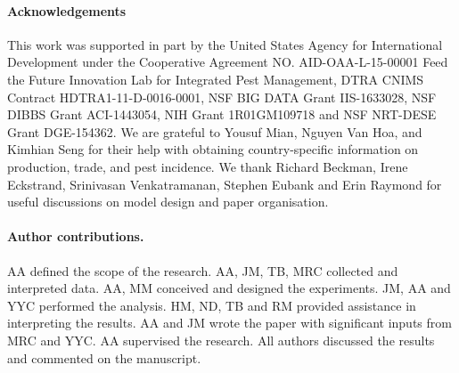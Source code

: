 \documentclass[11pt]{article}
\theoremstyle{definition}
\begin{document}
\paragraph{Acknowledgements}
This work was supported in part by the United States Agency for
International Development under the Cooperative Agreement NO.
AID-OAA-L-15-00001 Feed the Future Innovation Lab for Integrated Pest
Management, DTRA CNIMS Contract HDTRA1-11-D-0016-0001, NSF BIG DATA Grant
IIS-1633028, NSF DIBBS Grant ACI-1443054, NIH Grant 1R01GM109718 and NSF
NRT-DESE Grant DGE-154362.  We are grateful to Yousuf Mian, Nguyen Van Hoa,
and Kimhian Seng for their help with obtaining country-specific information
on production, trade, and pest incidence. We thank Richard Beckman, Irene
Eckstrand, Srinivasan Venkatramanan, Stephen Eubank and Erin Raymond for
useful discussions on model design and paper organisation.

\paragraph{Author contributions.}
AA defined the scope of the
research. AA, JM, TB, MRC collected and interpreted data.
AA, MM conceived and designed the
experiments. JM, AA and YYC performed the
analysis. HM, ND, TB and RM provided assistance in interpreting the
results. AA and JM wrote the paper with significant inputs from
MRC and YYC. AA supervised the research. All authors discussed the
results and commented on the manuscript.
\end{document}
